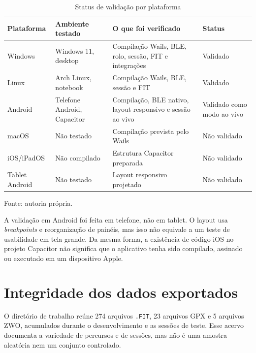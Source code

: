 \begin{table}[htbp]
    \centering
    \caption{Status de validação por plataforma}
    \label{tab:plataformas}
    \footnotesize
    \renewcommand{\arraystretch}{1.15}
    \setlength{\tabcolsep}{4pt}
    \begin{tabular}{@{}>{\raggedright\arraybackslash}p{2.8cm}
        >{\raggedright\arraybackslash}p{3.4cm}
        >{\raggedright\arraybackslash}p{6.2cm}
        >{\raggedright\arraybackslash}p{2.6cm}@{}}
        \toprule
        \textbf{Plataforma} & \textbf{Ambiente testado} &
        \textbf{O que foi verificado} & \textbf{Status} \\
        \midrule
        Windows & Windows 11, desktop & Compilação Wails, BLE, rolo,
        sessão, FIT e integrações & Validado \\
        Linux & Arch Linux, notebook & Compilação Wails, BLE, sessão e FIT &
        Validado \\
        Android & Telefone Android, Capacitor & Compilação, BLE nativo, layout
        responsivo e sessão ao vivo & Validado como modo ao vivo \\
        macOS & Não testado & Compilação prevista pelo Wails &
        Não validado \\
        iOS/iPadOS & Não compilado & Estrutura Capacitor preparada &
        Não validado \\
        Tablet Android & Não testado & Layout responsivo projetado &
        Não validado \\
        \bottomrule
    \end{tabular}
    \vspace{0.2cm}
    \par\small Fonte: autoria própria.
\end{table}

A validação em Android foi feita em telefone, não em tablet. O layout usa
\textit{breakpoints} e reorganização de painéis, mas isso não equivale a um
teste de usabilidade em tela grande. Da mesma forma, a existência de código
iOS no projeto Capacitor não significa que o aplicativo tenha sido compilado,
assinado ou executado em um dispositivo Apple.

\section{Integridade dos dados exportados}
\label{sec:avaliacao-dados}

O diretório de trabalho reúne 274 arquivos \texttt{.FIT}, 23 arquivos GPX e 5
arquivos ZWO, acumulados durante o desenvolvimento e as sessões de teste. Esse
acervo documenta a variedade de percursos e de sessões, mas não é uma amostra
aleatória nem um conjunto controlado.

